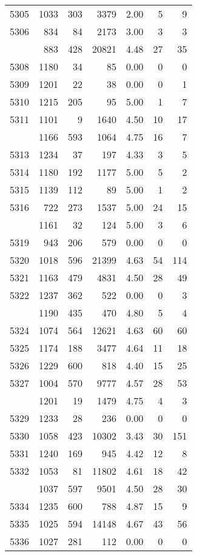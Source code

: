 \documentclass[
]{article}
\begin{document}
\begin{table}
\begin{tabular}[t]{lrrrrrr}
5305 & 1033 & 303 & 3379 & 2.00 & 5 & 9\\
5306 & 834 & 84 & 2173 & 3.00 & 3 & 3\\
\addlinespace
5307 & 883 & 428 & 20821 & 4.48 & 27 & 35\\
5308 & 1180 & 34 & 85 & 0.00 & 0 & 0\\
5309 & 1201 & 22 & 38 & 0.00 & 0 & 1\\
5310 & 1215 & 205 & 95 & 5.00 & 1 & 7\\
5311 & 1101 & 9 & 1640 & 4.50 & 10 & 17\\
\addlinespace
5312 & 1166 & 593 & 1064 & 4.75 & 16 & 7\\
5313 & 1234 & 37 & 197 & 4.33 & 3 & 5\\
5314 & 1180 & 192 & 1177 & 5.00 & 5 & 2\\
5315 & 1139 & 112 & 89 & 5.00 & 1 & 2\\
5316 & 722 & 273 & 1537 & 5.00 & 24 & 15\\
\addlinespace
5318 & 1161 & 32 & 124 & 5.00 & 3 & 6\\
5319 & 943 & 206 & 579 & 0.00 & 0 & 0\\
5320 & 1018 & 596 & 21399 & 4.63 & 54 & 114\\
5321 & 1163 & 479 & 4831 & 4.50 & 28 & 49\\
5322 & 1237 & 362 & 522 & 0.00 & 0 & 3\\
\addlinespace
5323 & 1190 & 435 & 470 & 4.80 & 5 & 4\\
5324 & 1074 & 564 & 12621 & 4.63 & 60 & 60\\
5325 & 1174 & 188 & 3477 & 4.64 & 11 & 18\\
5326 & 1229 & 600 & 818 & 4.40 & 15 & 25\\
5327 & 1004 & 570 & 9777 & 4.57 & 28 & 53\\
\addlinespace
5328 & 1201 & 19 & 1479 & 4.75 & 4 & 3\\
5329 & 1233 & 28 & 236 & 0.00 & 0 & 0\\
5330 & 1058 & 423 & 10302 & 3.43 & 30 & 151\\
5331 & 1240 & 169 & 945 & 4.42 & 12 & 8\\
5332 & 1053 & 81 & 11802 & 4.61 & 18 & 42\\
\addlinespace
5333 & 1037 & 597 & 9501 & 4.50 & 28 & 30\\
5334 & 1235 & 600 & 788 & 4.87 & 15 & 9\\
5335 & 1025 & 594 & 14148 & 4.67 & 43 & 56\\
5336 & 1027 & 281 & 112 & 0.00 & 0 & 0\\

\end{tabular}
\end{table}
\end{document}

